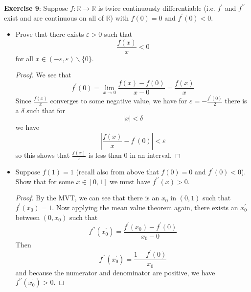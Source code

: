 \documentclass{article}
\begin{document}
\textbf{Exercise 9}: Suppose $f : \mathbb{R} \rightarrow \mathbb{R}$ is twice continuously differentiable (i.e. $f^{\prime}$ and $f^{\prime\prime}$ exist and are continuous on all of $\mathbb{R}$) with $f(0) = 0$ and $f^{\prime}(0) <0$. 
    \begin{itemize}
        \item Prove that there exists $\varepsilon > 0$ such that 
            \begin{equation*}
                \dfrac{f(x)}{x} < 0
            \end{equation*}
        for all $x \in (-\varepsilon, \varepsilon) \backslash \{0\}$.
            \begin{proof}
                We see that 
                    \begin{equation*}
                        f^{\prime}(0) = \lim\limits_{x \to 0}\dfrac{f(x) - f(0)}{x - 0} = \dfrac{f(x)}{x}
                    \end{equation*}
                Since $\frac{f(x)}{x}$ converges to some negative value, we have for $\varepsilon = -\frac{f^{\prime}(0)}{2}$ there is a $\delta$ such that for 
                    \begin{equation*}
                        \lvert x \rvert < \delta
                    \end{equation*}
                we have 
                    \begin{equation*}
                        \left\lvert \dfrac{f(x)}{x} - f^{\prime}(0) \right\rvert < \varepsilon
                    \end{equation*}
                so this shows that $\frac{f(x)}{x}$ is less than $0$ in an interval.
            \end{proof}

        \item Suppose $f(1) = 1$ (recall also from above that $f(0) = 0$ and $f^{\prime}(0) < 0$). Show that for some $x \in [0, 1]$ we must have $f^{\prime\prime}(x) > 0$.
            \begin{proof}
                By the MVT, we can see that there is an $x_{0}$ in $(0, 1)$ such that $f^{\prime}(x_{0}) = 1$. Now applying the mean value theorem again, there exists an $x_{0}^{\prime}$ between $(0, x_{0})$ such that 
                    \begin{equation*}
                        f^{\prime\prime}(x_{0}^{\prime}) = \dfrac{f^{\prime}(x_{0}) - f^{\prime}(0)}{x_{0} - 0}
                    \end{equation*}
                Then 
                    \begin{equation*}
                        f^{\prime\prime}(x_{0}^{\prime}) = \dfrac{1 - f^{\prime}(0)}{x_{0}}
                    \end{equation*}
                and because the numerator and denominator are positive, we have $f^{\prime\prime}(x_{0}^{\prime}) > 0$.
            \end{proof}
    \end{itemize}
\end{document}
